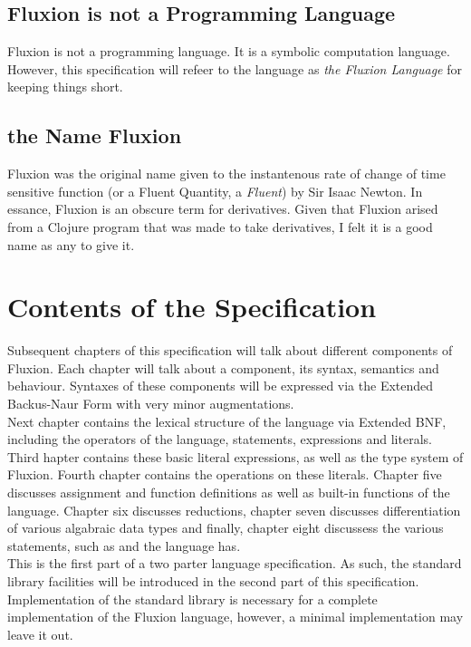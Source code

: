 \documentclass[11pt,a4paper]{book}
\begin{document}
\subsection{Fluxion is not a Programming Language}

Fluxion is not a programming language. It is a symbolic computation language. However, this specification will refeer to the language as \textit{the Fluxion Language} for keeping things short.

\subsection{the Name Fluxion}

Fluxion was the original name given to the instantenous rate of change of time sensitive function (or a Fluent Quantity, a \textit{Fluent}) by Sir Isaac Newton\cite{fluxionname}. In essance, Fluxion is an obscure term for derivatives\cite{collins}. Given that Fluxion arised from a Clojure program that was made to take derivatives, I felt it is a good name as any to give it.

\section{Contents of the Specification}

Subsequent chapters of this specification will talk about different components of Fluxion. Each chapter will talk about a component, its syntax, semantics and behaviour. Syntaxes of these components will be expressed via the Extended Backus-Naur Form\cite{ISO14977} with very minor augmentations. \\

Next chapter contains the lexical structure of the language via Extended BNF, including the operators of the language, statements, expressions and literals. Third hapter contains these basic literal expressions, as well as the type system of Fluxion. Fourth chapter contains the operations on these literals. Chapter five discusses assignment and function definitions as well as built-in functions of the language. Chapter six discusses reductions, chapter seven discusses differentiation of various algabraic data types and finally, chapter eight discussess the various statements, such as  and  the language has. \\

This is the first part of a two parter language specification. As such, the standard library facilities will be introduced in the second part of this specification. Implementation of the standard library is necessary for a complete implementation of the Fluxion language, however, a minimal implementation may leave it out.
\end{document}
